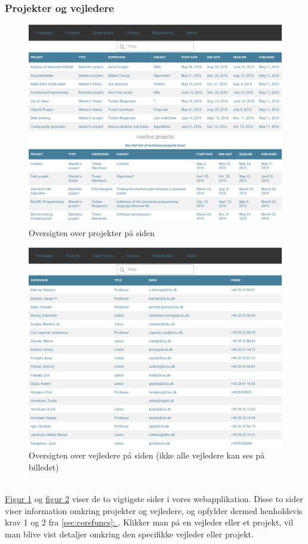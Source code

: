 \documentclass[12pt]{article}
\begin{document}
\subsubsection{Projekter og vejledere}
\begin{figure}[H]
    \centering
    \includegraphics[scale=0.33]{frontend_projects.png}
    \caption{Oversigten over projekter på siden}
    \label{fig:frontend_projects}
\end{figure}
\begin{figure}[H]
    \centering
    \includegraphics[scale=0.33]{frontend_supervisors.png}
    \caption{Oversigten over vejledere på siden (ikke alle vejledere kan ses på billedet)}
    \label{fig:frontend_supervisors}
\end{figure}
~\\
\hyperref[fig:frontend_projects]{Figur \ref*{fig:frontend_projects}} og \hyperref[fig:frontend_supervisors]{figur \ref*{fig:frontend_supervisors}} viser de to vigtigste sider i vores webapplikation. Disse to sider viser information omkring projekter og vejledere, og opfylder dermed henholdsvis krav 1 og 2 fra \hyperref[sec:corefuncs]{\ref*{sec:corefuncs}: }. Klikker man på en vejleder eller et projekt, vil man blive vist detaljer omkring den specifikke vejleder eller projekt.
\end{document}
